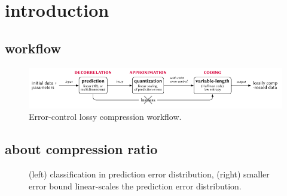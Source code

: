 \section{introduction}

\subsection{workflow}

\begin{figure}\centering
\includegraphics[width=8in]{fig/standalone_errorControl.pdf}
\caption{Error-control lossy compression workflow.}
\end{figure}

\subsection{about compression ratio}

\begin{figure}\centering
{}
\caption{(left) classification in prediction error distribution, (right) smaller error bound linear-scales the prediction error distribution.}
\end{figure}

